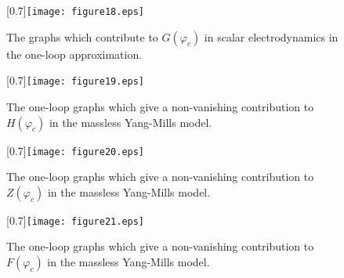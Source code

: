 \documentclass[12pt,epsf]{report}
\def\pc{\varphi_c}
\begin{document}
\clearpage

\begin{figure}[t]
\begin{center}
\scalebox{0.7}[0.7]{\texttt{[image: figure18.eps]}}
\par
\vskip-2.0cm{}
\end{center}
\begin{quote}
\caption{\small  The graphs which contribute to $G(\pc)$ in scalar
electrodynamics in the one-loop approximation.  }
\end{quote}
\end{figure}



\begin{figure}[t]
\begin{center}
\scalebox{0.7}[0.7]{\texttt{[image: figure19.eps]}}
\par
\vskip-2.0cm{}
\end{center}
\begin{quote}
\caption{\small The one-loop graphs which give a non-vanishing 
contribution to $H(\pc)$ in the massless Yang-Mills model.  }
\end{quote}
\end{figure}


\begin{figure}[tt]
\begin{center}
\scalebox{0.69}[0.7]{\texttt{[image: figure20.eps]}}
\par
\vskip-2.0cm{}
\end{center}
\begin{quote}
\caption{\small The one-loop graphs which give a non-vanishing 
contribution to $Z(\pc)$ in the massless Yang-Mills model.  }
\end{quote}
\end{figure}

\begin{figure}[t]
\begin{center}
\scalebox{0.64}[0.7]{\texttt{[image: figure21.eps]}}
\par
\vskip-2.0cm{}
\end{center}
\begin{quote}
\caption{\small The one-loop graphs which give a non-vanishing 
contribution to $F(\pc)$ in the massless Yang-Mills model.  }
\end{quote}
\end{figure}
\end{document}
